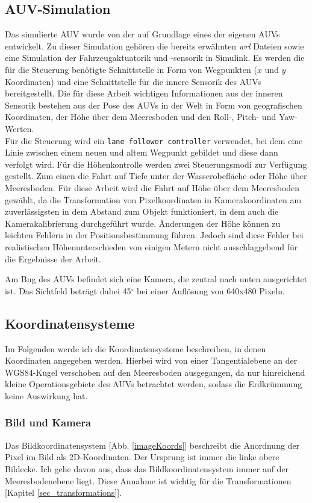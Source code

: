 \subsection{AUV-Simulation}
\label{sec_auvSimGrundlage}
Das simulierte AUV wurde von der \atlas auf Grundlage eines der eigenen AUVs entwickelt. Zu dieser Simulation gehören die bereits erwähnten \textit{wrl} Dateien sowie eine Simulation der Fahrzeugaktuatorik und -sensorik in \matlab Simulink. Es werden die für die Steuerung benötigte Schnittstelle in Form von Wegpunkten ($x$ und $y$ Koordinaten) und eine Schnittstelle für die innere Sensorik des AUVs bereitgestellt. Die für diese Arbeit wichtigen Informationen aus der inneren Sensorik bestehen aus der Pose des AUVs in der Welt in Form von geografischen Koordinaten, der Höhe über dem Meeresboden und den Roll-, Pitch- und Yaw-Werten.\\
Für die Steuerung wird ein \texttt{lane follower controller} verwendet, bei dem eine Linie zwischen einem neuen und altem Wegpunkt gebildet und diese dann verfolgt wird. Für die Höhenkontrolle werden zwei Steuerungsmodi zur Verfügung gestellt. Zum einen die Fahrt auf Tiefe unter der Wasserobefläche oder Höhe über Meeresboden. Für diese Arbeit wird die Fahrt auf Höhe über dem Meeresboden gewählt, da die Transformation von Pixelkoordinaten in Kamerakoordinaten am zuverlässigsten in dem Abstand zum Objekt funktioniert, in dem auch die Kamerakalibrierung durchgeführt wurde. Änderungen der Höhe können zu leichten Fehlern in der Positionsbestimmung führen. Jedoch sind diese Fehler bei realistischen Höhenunterschieden von einigen Metern nicht ausschlaggebend für die Ergebnisse der Arbeit.

Am Bug des AUVs befindet sich eine Kamera, die zentral nach unten ausgerichtet ist. Das Sichtfeld beträgt dabei 45$^\circ$ bei einer Auflösung von 640x480 Pixeln.
\subsection{Koordinatensysteme}
\label{sec_coordsystems}
Im Folgenden werde ich die Koordinatensysteme beschreiben, in denen Koordinaten angegeben werden. Hierbei wird von einer Tangentialebene an der WGS84-Kugel verschoben auf den Meeresboden ausgegangen, da nur hinreichend kleine Operationsgebiete des AUVs betrachtet werden, sodass die Erdkrümmung keine Auswirkung hat.
\subsubsection{Bild und Kamera}
\label{sec_img_cam_coords}
Das Bildkoordinatensystem [Abb. \ref{imageKoords}] beschreibt die Anordnung der Pixel im Bild als 2D-Koordinaten. Der Ursprung ist immer die linke obere Bildecke. Ich gehe davon aus, dass das Bildkoordinatensystem immer auf der Meeresbodenebene liegt. Diese Annahme ist wichtig für die Transformationen [Kapitel \ref{sec_transformations}].

